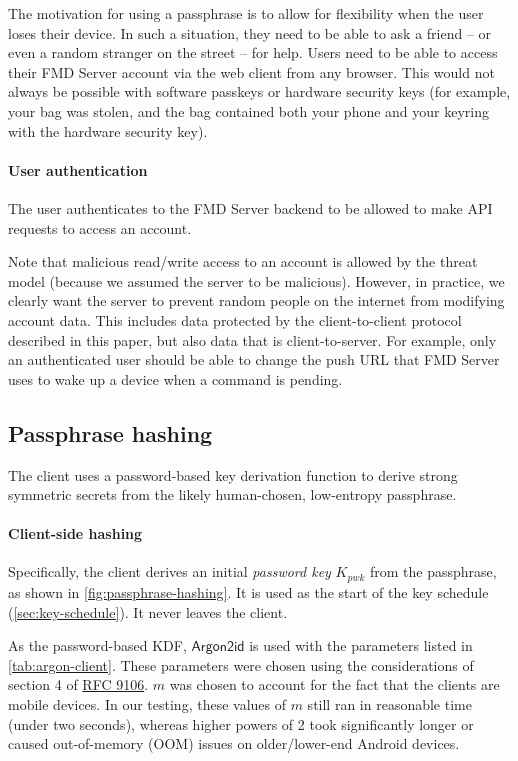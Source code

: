 \documentclass[11pt,a4paper]{article}
\newcommand{\Argon}{\mathsf{Argon2id}}
\begin{document}
The motivation for using a passphrase is to allow for flexibility when the user loses their device.
In such a situation, they need to be able to ask a friend -- or even a random stranger on the street -- for help.
Users need to be able to access their FMD Server account via the web client from any browser.
This would not always be possible with software passkeys or hardware security keys
(for example, your bag was stolen, and the bag contained both your phone and your keyring with the hardware security key).


\paragraph{User authentication}
The user authenticates to the FMD Server backend to be allowed to make API requests to access an account.

Note that malicious read/write access to an account is allowed by the threat model
(because we assumed the server to be malicious).
However, in practice, we clearly want the server to prevent random people
on the internet from modifying account data.
This includes data protected by the client-to-client protocol described in this paper,
but also data that is client-to-server.
For example, only an authenticated user should be able to change the push URL
that FMD Server uses to wake up a device when a command is pending.


\subsection{Passphrase hashing}\label{sec:passphrase-hashing}

The client uses a password-based key derivation function to derive strong symmetric
secrets from the likely human-chosen, low-entropy passphrase.

\paragraph{Client-side hashing}
Specifically, the client derives an initial \emph{password key} $K_{pwk}$ from the passphrase,
as shown in \autoref{fig:passphrase-hashing}.
It is used as the start of the key schedule (\autoref{sec:key-schedule}).
It never leaves the client.

As the password-based KDF, $\Argon$ is used with the parameters listed in \autoref{tab:argon-client}.
These parameters were chosen using the considerations of section 4 of
\href{https://datatracker.ietf.org/doc/html/rfc9106}{RFC 9106}.
$m$ was chosen to account for the fact that the clients are mobile devices.
In our testing, these values of $m$ still ran in reasonable time (under two seconds),
whereas higher powers of 2 took significantly longer or caused out-of-memory (OOM)
issues on older/lower-end Android devices.
\end{document}
